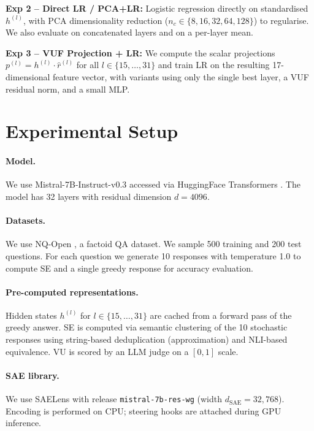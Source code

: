 \documentclass{article}
\begin{document}
\textbf{Exp 2 -- Direct LR / PCA+LR:}
Logistic regression directly on standardised $h^{(l)}$, with PCA
dimensionality reduction ($n_c \in \{8, 16, 32, 64, 128\}$) to regularise.
We also evaluate on concatenated layers and on a per-layer mean.

\textbf{Exp 3 -- VUF Projection + LR:}
We compute the scalar projections $p^{(l)} = h^{(l)} \cdot \hat{r}^{(l)}$
for all $l \in \{15, \ldots, 31\}$ and train LR on the resulting 17-dimensional
feature vector, with variants using only the single best layer, a VUF residual
norm, and a small MLP.

\section{Experimental Setup}
\label{sec:setup}

\paragraph{Model.}  We use Mistral-7B-Instruct-v0.3 accessed via
HuggingFace Transformers \citep{wolf2020transformers}.  The model has 32
layers with residual dimension $d = 4096$.

\paragraph{Datasets.}  We use NQ-Open \citep{kwiatkowski2019nq}, a
factoid QA dataset.  We sample 500 training and 200 test questions.  For each
question we generate 10 responses with temperature 1.0 to compute SE and a
single greedy response for accuracy evaluation.

\paragraph{Pre-computed representations.}  Hidden states $h^{(l)}$ for
$l \in \{15, \ldots, 31\}$ are cached from a forward pass of the greedy answer.
SE is computed via semantic clustering of the 10 stochastic responses using
string-based deduplication (approximation) and NLI-based equivalence.  VU is
scored by an LLM judge on a $[0, 1]$ scale.

\paragraph{SAE library.}  We use SAELens \citep{bloom2024saelens} with
release \texttt{mistral-7b-res-wg} (width $d_{\mathrm{SAE}} = 32{,}768$).
Encoding is performed on CPU; steering hooks are attached during GPU inference.
\end{document}
